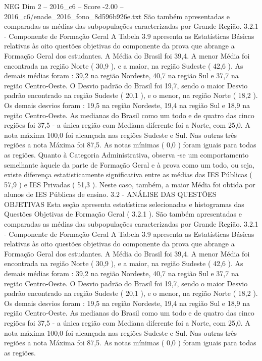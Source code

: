 \begin{textsample}{NEG Dim 2 – 2016\_c6 – Score -2.00 – 2016\_c6/enade\_2016\_fono\_8d596b926e.txt}
São também apresentadas e comparadas as médias das subpopulações caracterizadas por Grande Região. 3.2.1 - Componente de Formação Geral A Tabela 3.9 apresenta as Estatísticas Básicas relativas às oito questões objetivas do componente da prova que abrange a Formação Geral dos estudantes.
A Média do Brasil foi 39,4.
A menor Média foi encontrada na região Norte ( 30,9 ), e a maior, na região Sudeste ( 42,6 ).
As demais médias foram : 39,2 na região Nordeste, 40,7 na região Sul e 37,7 na região Centro-Oeste.
O Desvio padrão do Brasil foi 19,7, sendo o maior Desvio padrão encontrado na região Sudeste ( 20,1 ), e o menor, na região Norte ( 18,2 ).
Os demais desvios foram : 19,5 na região Nordeste, 19,4 na região Sul e 18,9 na região Centro-Oeste.
As medianas do Brasil como um todo e de quatro das cinco regiões foi 37,5 - a única região com Mediana diferente foi a Norte, com 25,0.
A nota máxima 100,0 foi alcançada nas regiões Sudeste e Sul.
Nas outras três regiões a nota Máxima foi 87,5.
As notas mínimas ( 0,0 ) foram iguais para todas as regiões.
Quanto à Categoria Administrativa, observa -se um comportamento semelhante àquele da parte de Formação Geral e à prova como um todo, ou seja, existe diferença estatisticamente significativa entre as médias das IES Públicas ( 57,9 ) e IES Privadas ( 51,3 ).
Neste caso, também, a maior Média foi obtida por alunos de IES Públicas de ensino. 3.2 - ANÁLISE DAS QUESTÕES OBJETIVAS Esta seção apresenta estatísticas selecionadas e histogramas das Questões Objetivas de Formação Geral ( 3.2.1 ).
São também apresentadas e comparadas as médias das subpopulações caracterizadas por Grande Região. 3.2.1 - Componente de Formação Geral A Tabela 3.9 apresenta as Estatísticas Básicas relativas às oito questões objetivas do componente da prova que abrange a Formação Geral dos estudantes.
A Média do Brasil foi 39,4.
A menor Média foi encontrada na região Norte ( 30,9 ), e a maior, na região Sudeste ( 42,6 ).
As demais médias foram : 39,2 na região Nordeste, 40,7 na região Sul e 37,7 na região Centro-Oeste.
O Desvio padrão do Brasil foi 19,7, sendo o maior Desvio padrão encontrado na região Sudeste ( 20,1 ), e o menor, na região Norte ( 18,2 ).
Os demais desvios foram : 19,5 na região Nordeste, 19,4 na região Sul e 18,9 na região Centro-Oeste.
As medianas do Brasil como um todo e de quatro das cinco regiões foi 37,5 - a única região com Mediana diferente foi a Norte, com 25,0.
A nota máxima 100,0 foi alcançada nas regiões Sudeste e Sul.
Nas outras três regiões a nota Máxima foi 87,5.
As notas mínimas ( 0,0 ) foram iguais para todas as regiões.

\end{textsample}

